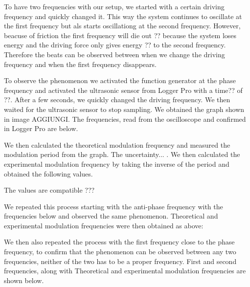 \documentclass{article}
\begin{document}
To have two frequencies with our setup, we started with a certain driving frequency and quickly changed it. This way the system continues to oscillate at the first frequency but als starts oscillationg at the second frequency. However, beacuse of friction the first frequency will die out ?? because the system loses energy and the driving force only gives energy ?? to the second frequency. Therefore the beats can be observed between when we change the driving frequency and when the first frequency disappears. 

To observe the phenomenon we activated the function generator at the phase frequency and activated the ultrasonic sensor from Logger Pro with a time?? of ??. After a few seconds, we quickly changed the driving frequency. We then waited for the ultrasonic sensor to stop sampling. We obtained the graph shown in image AGGIUNGI. The frequencies, read from the oscilloscope and confirmed in Logger Pro are below.

We then calculated the theoretical modulation frequency and measured the modulation period from the graph. The uncertainty... . We then calculated the experimental modulation frequency by taking the inverse of the period and obtained the following values. 

The values are compatible ???

We repeated this process starting with the anti-phase frequency with the frequencies below and observed the same phenomenon. Theoretical and experimental modulation frequencies were then obtained as above:

We then also repeated the process with the first frequency close to the phase frequency, to confirm that the phenomenon can be observed between any two frequencies, neither of the two has to be a proper frequency. First and second frequencies, along with Theoretical and experimental modulation frequencies are shown below.
\end{document}
